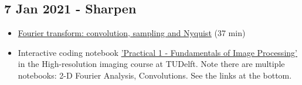 \documentclass[11pt, oneside]{article}   	%
\begin{document}
\subsection{7 Jan 2021 - Sharpen}
\begin{itemize}
	\item \href{https://youtu.be/_F-YDwY9X30}{Fourier transform: convolution, sampling and Nyquist} (37 min)
	\item Interactive coding notebook \href{https://gitlab.tudelft.nl/aj-lab/teaching/-/wikis/NB4020}{'Practical 1 - Fundamentals of Image Processing'} in the High-resolution imaging course at TUDelft. Note there are multiple notebooks: 2-D Fourier Analysis, Convolutions. See the links at the bottom.
\end{itemize}

\pagebreak
\end{document}
